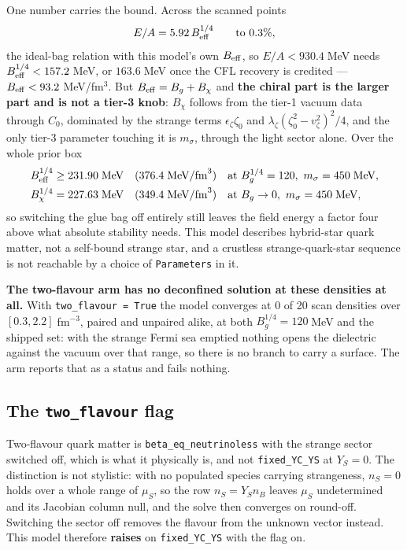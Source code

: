 \documentclass[11pt,a4paper]{article}
\begin{document}
One number carries the bound. Across the scanned points
%
\begin{equation}
E/A = 5.92\, B_{\rm eff}^{1/4} \qquad \text{to } 0.3\%,
\end{equation}
%
the ideal-bag relation with this model's own $B_{\rm eff}$, so
$E/A < 930.4\;$MeV needs $B_{\rm eff}^{1/4} < 157.2\;$MeV, or $163.6\;$MeV once
the CFL recovery is credited --- $B_{\rm eff} < 93.2\;$MeV/fm$^3$. But
$B_{\rm eff} = B_g + B_\chi$ and \textbf{the chiral part is the larger part and
is not a tier-3 knob}: $B_\chi$ follows from the tier-1 vacuum data through
$C_0$, dominated by the strange terms $\epsilon_\zeta \zeta_0$ and
$\lambda_\zeta(\zeta_0^2 - v_\zeta^2)^2/4$, and the only tier-3 parameter
touching it is $m_\sigma$, through the light sector alone. Over the whole prior
box
%
\begin{align}
B_{\rm eff}^{1/4} &\ge 231.90\;\text{MeV} \quad (376.4\;\text{MeV/fm}^3)
 &&\text{at } B_g^{1/4} = 120,\ m_\sigma = 450\;\text{MeV}, \\
B_\chi^{1/4} &= 227.63\;\text{MeV} \quad (349.4\;\text{MeV/fm}^3)
 &&\text{at } B_g \to 0,\ m_\sigma = 450\;\text{MeV},
\end{align}
%
so switching the glue bag off entirely still leaves the field energy a factor
four above what absolute stability needs. This model describes hybrid-star
quark matter, not a self-bound strange star, and a crustless strange-quark-star
sequence is not reachable by a choice of \texttt{Parameters} in it.

\textbf{The two-flavour arm has no deconfined solution at these densities at
all.} With \texttt{two\_flavour = True} the model converges at 0 of 20 scan
densities over $[0.3, 2.2]\;$fm$^{-3}$, paired and unpaired alike, at both
$B_g^{1/4} = 120\;$MeV and the shipped set: with the strange Fermi sea emptied
nothing opens the dielectric against the vacuum over that range, so there is no
branch to carry a surface. The arm reports that as a status and fails nothing.

\subsection{The \texttt{two\_flavour} flag}

Two-flavour quark matter is \texttt{beta\_eq\_neutrinoless} with the strange
sector switched off, which is what it physically is, and not
\texttt{fixed\_YC\_YS} at $Y_S = 0$. The distinction is not stylistic: with no
populated species carrying strangeness, $n_S = 0$ holds over a whole range of
$\mu_S$, so the row $n_S = Y_S n_B$ leaves $\mu_S$ undetermined and its
Jacobian column null, and the solve then converges on round-off. Switching the
sector off removes the flavour from the unknown vector instead. This model
therefore \textbf{raises} on \texttt{fixed\_YC\_YS} with the flag on.
\end{document}
